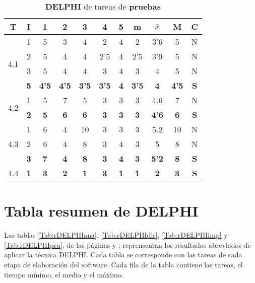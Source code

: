 \documentclass[11pt,a4paper,spanish,twoside]{report}
\begin{document}
\begin{table}[!h]
\centering
  \begin{tabular}{|c|c||c|c|c|c|c||c|c|c||c|}
    \hline
    \textbf{T} & \textbf{I} & \textbf{1} &
    \textbf{2} & \textbf{3} & \textbf{4} & \textbf{5} & \textbf{m}
    &\textbf{$\bar{x}$} &\textbf{M} & \textbf{C}\\    
    \hline \hline

    \multirow{4}{*}{4.1}
    & 1 & 5 & 3 & 4 & 2   & 4 & 2   & 3'6 & 5 & N \\
    & 2 & 5 & 4 & 4 & 2'5 & 4 & 2'5 & 3'9 & 5 & N \\
    & 3 & 5 & 4 & 4 & 3   & 4 & 3   & 4   & 5 & N \\
    & \textbf{5} & \textbf{4'5} & \textbf{4'5} & \textbf{3'5} & \textbf{3'5}
    & \textbf{4} & \textbf{3'5} & \textbf{4} & \textbf{4'5} & \textbf{S} \\
    \hline
    
    \multirow{2}{*}{4.2} & 1 & 5 & 7 & 5 & 3 & 3 & 3 & 4.6 & 7 & N \\
    & \textbf{2} & \textbf{5} & \textbf{6} & \textbf{6} & \textbf{3} &
    \textbf{3} & \textbf{3} & \textbf{4'6} & \textbf{6} & \textbf{S} \\
    \hline

    \multirow{3}{*}{4.3}
    & 1 & 6 & 4 & 10 & 3 & 3 & 3 & 5.2 & 10 & N \\
    & 2 & 6 & 4 & 8  & 3 & 4 & 3 & 5   & 8  & N \\
    & \textbf{3} & \textbf{7} & \textbf{4} & \textbf{8} & \textbf{3} &
    \textbf{4} & \textbf{3} & \textbf{5'2} & \textbf{8} & \textbf{S} \\
    \hline

    4.4 & \textbf{1} & \textbf{3} & \textbf{2} & \textbf{1} &
    \textbf{3} & \textbf{1} & \textbf{1} & \textbf{2} & \textbf{3} &
    \textbf{S} \\
    \hline
  \end{tabular}
  \caption{\textbf{DELPHI} de tareas de \textbf{pruebas}}
  \label{Tab:DELPHIpru}
\end{table} 

\section{Tabla resumen de DELPHI}
Las tablas \ref{Tab:rDELPHIana}, \ref{Tab:rDELPHIdis}, \ref{Tab:rDELPHIimp} y
\ref{Tab:rDELPHIpru}, de las páginas \pageref{Tab:rDELPHIana} y
\pageref{Tab:rDELPHIdis}; reprensentan los resultados abreviados de aplicar
la técnica DELPHI. Cada tabla se corresponde con las tareas de cada etapa de
elaboración del software. Cada fila de la tabla contiene las tareas, el
tiempo mínimo, el medio y el máximo.
\end{document}

